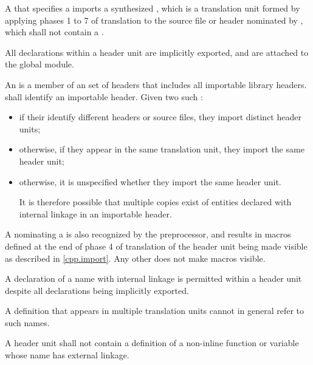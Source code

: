 \pnum
A  that specifies
a   imports
a synthesized ,
which is a translation unit formed by applying
phases 1 to 7 of translation
to the source file or header nominated by ,
which shall not contain a .
\begin{note}
All declarations within a header unit are implicitly
exported,
and are attached to the global module.
\end{note}
An  is a member of an
set of headers that
includes all importable \Cpp{} library headers.
 shall identify an importable header.
Given two such :
\begin{itemize}
\item
if their  identify
different headers or source files,
they import distinct header units;
\item
otherwise, if they appear in the same translation unit,
they import the same header unit;
\item
otherwise, it is unspecified whether they import the same header unit.
\begin{note}
It is therefore possible that multiple copies exist of entities
declared with internal linkage in an importable header.
\end{note}
\end{itemize}
\begin{note}
A  nominating
a  is also recognized by the
preprocessor, and results in macros defined at the
end of phase 4 of translation of the header unit
being made visible as described in \ref{cpp.import}.
Any other 
does not make macros visible.
\end{note}

\pnum
A declaration of a name with internal linkage is
permitted within a header unit despite all
declarations being implicitly exported.
\begin{note}
A definition that appears in multiple translation units
cannot in general refer to such names.
\end{note}
A header unit shall not contain
a definition of a non-inline function or variable
whose name has external linkage.

